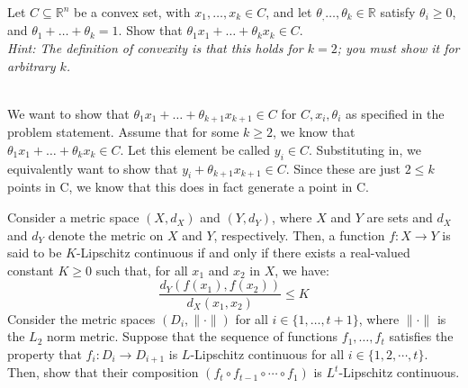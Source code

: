 \problem[5] Let $C \subseteq \mathbb{R}^n$ be a convex set, with $x_1, \dots, x_k\in C$, and let $\theta_, \dots, \theta_k \in \mathbb{R}$ satisfy $\theta_i\geq 0$, and 
$\theta_1 + \dots + \theta_k = 1$. Show that $\theta_1 x_1 + \dots + \theta_k x_k \in C$. \\
\emph{Hint: The definition of convexity is that this holds for $k = 2$; you must show it for arbitrary $k$.}\\

\begin{solution}
  \\
  We want to show that $\theta_1 x_1 + \dots + \theta_{k+1} x_{k+1} \in C$ for $C, x_i, \theta_i$ as specified in the problem statement. Assume that for some $k \geq 2$, we know that $\theta_1 x_1 + \dots + \theta_k x_k \in C$. Let this element be called $y_i \in C$. Substituting in, we equivalently want to show that $y_i + \theta_{k+1} x_{k+1} \in C$. Since these are just $2 \leq k$ points in C, we know that this does in fact generate a point in C.
\end{solution}

\vspace{0.5cm}

 Consider a metric space $(X, d_X)$ and $(Y, d_Y)$, where $X$ and $Y$ are sets and $d_X$ and $d_Y$ denote the metric on $X$ and $Y$, respectively. Then, a function $f:X\to Y$ is said to be $K$-Lipschitz continuous if and only if there exists a real-valued constant $K\geq 0$ such that, for all $x_1$ and $x_2$ in $X$, we have:
\[\frac{d_Y(f(x_1), f(x_2))}{d_X(x_1, x_2)} \leq K\]
Consider the metric spaces $(D_i, \|\cdot\|)$ for all $i\in\{1, \dots, t+1\}$, where $\|\cdot\|$ is the $L_2$ norm metric. Suppose that the sequence of functions $f_1, \dots, f_t$ satisfies the property that $f_i: D_i \to D_{i+1}$ is $L$-Lipschitz continuous for all $i \in \{1, 2, \cdots, t\}$. Then, show that their composition $(f_t \circ f_{t-1} \circ \cdots \circ f_1)$ is $L^t$-Lipschitz continuous.\\

\begin{solution}
    
\end{solution}


